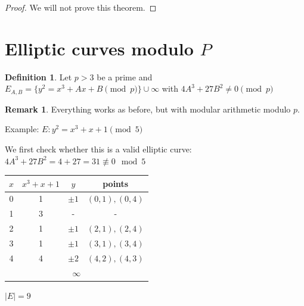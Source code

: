 \documentclass[11pt]{article}
\theoremstyle{definition}
\newtheorem{definition}{Definition}[section]
\newtheorem{remark}{Remark}[section]
\theoremstyle{proof}
\begin{document}
\begin{proof}
	We will not prove this theorem.
\end{proof}

\section{Elliptic curves modulo $P$}

\begin{definition}
	Let $p > 3$ be a prime and $E_{A, B} = \{y^2 = x^3 + Ax + B \pmod{p}\} \cup \infty$ with $4A^3 + 27B^2 \ne 0 \pmod{p}$
\end{definition}

\begin{remark}
	Everything works as before, but with modular arithmetic modulo $p$.
\end{remark}

Example: $E: y^2 = x^3 + x + 1 \pmod{5}$

We first check whether this is a valid elliptic curve: $4A^3 + 27B^2 = 4 + 27 = 31 \not \equiv 0 \mod{5}$

\vspace{1em}
\begin{center}
	\begin{tabular}{|c|c|c|c|}
		\hline
		$x$ & $x^3 + x + 1$ & $y$ & points \\ \hline
		0 & 1 & $\pm 1$ & $(0, 1), (0, 4)$ \\ \hline
		1 & 3 & - & - \\ \hline
		2 & 1 & $\pm 1$ & $(2, 1), (2, 4)$ \\ \hline
		3 & 1 & $\pm 1$ & $(3, 1), (3, 4)$ \\ \hline
		4 & 4 & $\pm 2$ & $(4, 2), (4, 3)$ \\ \hline
		\multicolumn{4}{|c|}{$\infty$} \\ \hline
	\end{tabular}	
\end{center}
\vspace{1em}

$|E| = 9$
\end{document}
